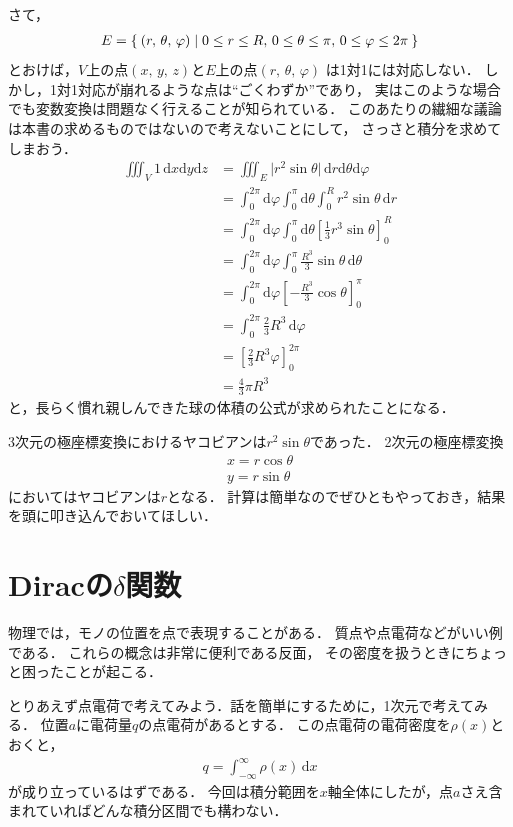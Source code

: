 さて，
\begin{align*}
E = \Set{ (r, \, \theta , \, \varphi) 
| 0 \leq r \leq R , \, 0 \leq \theta \leq \pi , \, 0 \leq \varphi \leq 2 \pi }
\end{align*}
とおけば，$V$上の点$(x, \, y, \, z)$と$E$上の点$(r, \, \theta , \, \varphi)$
は1対1には対応しない．
しかし，1対1対応が崩れるような点は``ごくわずか''であり，
実はこのような場合でも変数変換は問題なく行えることが知られている．
このあたりの繊細な議論は本書の求めるものではないので考えないことにして，
さっさと積分を求めてしまおう．
\begin{align*}
\iiint_V 1 \, \mathrm{d} x \mathrm{d} y \mathrm{d} z 
& = \iiint_E \lvert r^2 \sin \theta \rvert 
\, \mathrm{d} r \mathrm{d} \theta \mathrm{d} \varphi \\
& = \int_0^{2\pi} \mathrm{d} \varphi \int_0^{\pi} \mathrm{d} \theta
\int_0^R r^2 \sin \theta \, \mathrm{d}r \\
& = \int_0^{2\pi} \mathrm{d} \varphi \int_0^{\pi} \mathrm{d} \theta
\left[ \frac{1}{3} r^3 \sin \theta \right]_0^R \\
& = \int_0^{2\pi} \mathrm{d} \varphi 
\int_0^{\pi} \frac{R^3}{3} \sin \theta \, \mathrm{d} \theta \\
& = \int_0^{2\pi} \mathrm{d} \varphi 
\left[ - \frac{R^3}{3} \cos \theta \right]_0^{\pi} \\
& = \int_0^{2\pi} \frac{2}{3} R^3 \, \mathrm{d} \varphi \\
& = \left[ \frac{2}{3} R^3 \varphi \right]_0^{2\pi} \\
& = \frac{4}{3} \pi R^3
\end{align*}
と，長らく慣れ親しんできた球の体積の公式が求められたことになる．

3次元の極座標変換におけるヤコビアンは$r^2 \sin \theta$であった．
2次元の極座標変換
\begin{align*}
x = r \cos \theta \\
y = r \sin \theta
\end{align*}
においてはヤコビアンは$r$となる．
計算は簡単なのでぜひともやっておき，結果を頭に叩き込んでおいてほしい．

\section{\textrm{Dirac}の$\delta$関数}
物理では，モノの位置を点で表現することがある．
質点や点電荷などがいい例である．
これらの概念は非常に便利である反面，
その密度を扱うときにちょっと困ったことが起こる．

とりあえず点電荷で考えてみよう．話を簡単にするために，1次元で考えてみる．
位置$a$に電荷量$q$の点電荷があるとする．
この点電荷の電荷密度を$\rho(x)$とおくと，
\begin{align}
q = \int_{- \infty}^{\infty} \rho ( x ) \, \mathrm{d} x 
\label{eq:denkamitudo}
\end{align}
が成り立っているはずである．
今回は積分範囲を$x$軸全体にしたが，点$a$さえ含まれていればどんな積分区間でも構わない．

